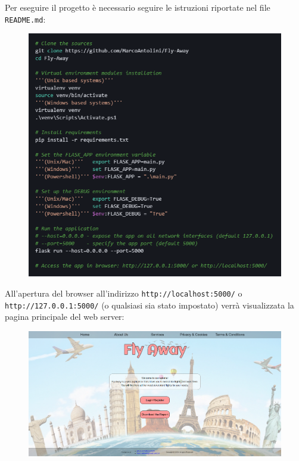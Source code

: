 \documentclass[12pt]{article}
\def\code#1{\texttt{#1}}
\begin{document}
Per eseguire il progetto è necessario seguire le istruzioni riportate nel file \code{README.md}:
\vskip 0.3cm
\begin{figure}[h]
    \includegraphics[width=13cm]{readme.png}
    \centering
\end{figure}
\vskip 0.5cm
\noindent
All'apertura del browser all'indirizzo \code{http://localhost:5000/} o \code{http://127.0.0.1:5000/} (o qualsiasi sia stato impostato) verrà visualizzata la pagina principale del web server:
\vskip 0.3cm
\begin{figure}[h]
    \includegraphics[width=17cm]{website.png}
    \centering
\end{figure}
\end{document}
